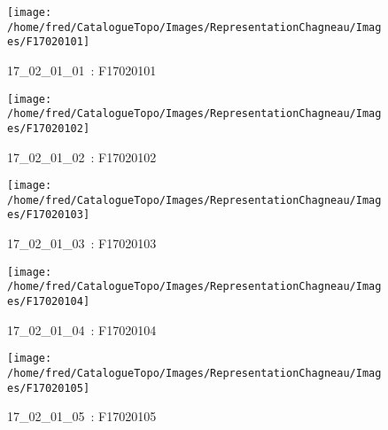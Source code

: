 \documentclass[12pt,titlepage,oneside]{book}
\begin{document}
\begin{figure}[h!]
  \hfill         %
  \begin{minipage}[t]{3cm}
    \begin{center}
      \texttt{[image: /home/fred/CatalogueTopo/Images/RepresentationChagneau/Images/F17020101]}
      \caption[~17\_02\_01\_01]{\small{17\_02\_01\_01~:} \tiny{F17020101}}\label{F17020101}
    \end{center}
  \end{minipage}
  \begin{minipage}[t]{3cm}
    \begin{center}
      \texttt{[image: /home/fred/CatalogueTopo/Images/RepresentationChagneau/Images/F17020102]}
      \caption[~17\_02\_01\_02]{\small{17\_02\_01\_02~:} \tiny{F17020102}}\label{F17020102}
    \end{center}
  \end{minipage}
  \begin{minipage}[t]{3cm}
    \begin{center}
      \texttt{[image: /home/fred/CatalogueTopo/Images/RepresentationChagneau/Images/F17020103]}
      \caption[~17\_02\_01\_03]{\small{17\_02\_01\_03~:} \tiny{F17020103}}\label{F17020103}
    \end{center}
  \end{minipage}
  \begin{minipage}[t]{3cm}
    \begin{center}
      \texttt{[image: /home/fred/CatalogueTopo/Images/RepresentationChagneau/Images/F17020104]}
      \caption[~17\_02\_01\_04]{\small{17\_02\_01\_04~:} \tiny{F17020104}}\label{F17020104}
    \end{center}
  \end{minipage}
  \begin{minipage}[t]{3cm}
    \begin{center}
      \texttt{[image: /home/fred/CatalogueTopo/Images/RepresentationChagneau/Images/F17020105]}
      \caption[~17\_02\_01\_05]{\small{17\_02\_01\_05~:} \tiny{F17020105}}\label{F17020105}
    \end{center}
  \end{minipage}
  \begin{minipage}[t]{3cm}

\end{minipage}
\end{figure}
\end{document}
